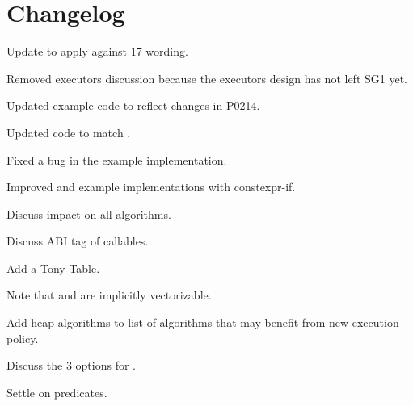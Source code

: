 \section{Changelog}
\begin{revision}
  \item Update to apply against \CC{}17 wording.
  \item Removed executors discussion because the executors design has not left SG1 yet.
  \item Updated example code to reflect changes in P0214.
\end{revision}

\begin{revision}
  \item Updated code to match \cite{N4744}.
  \item Fixed a bug in the  example implementation.
  \item Improved  and  example implementations with constexpr-if.
  \item Discuss impact on all algorithms.
\end{revision}

\begin{revision}
  \item Discuss ABI tag of  callables.
  \item Add a Tony Table.
  \item Note that  and  are implicitly vectorizable.
\end{revision}

\begin{revision}
  \item Add heap algorithms to list of algorithms that may benefit from new execution policy.
  \item Discuss the 3 options for .
  \item Settle on  predicates.
\end{revision}

